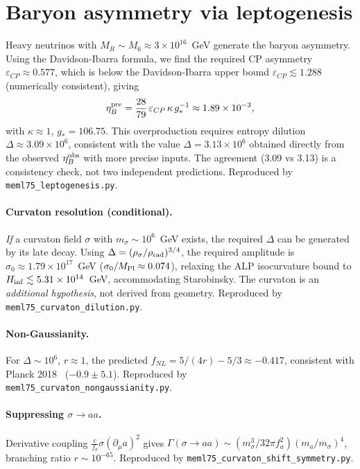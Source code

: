 \documentclass[12pt,a4paper]{article}
\numberwithin{equation}{section}
\begin{document}
\section{Baryon asymmetry via leptogenesis}
\label{sec:leptogenesis}
Heavy neutrinos with \(M_R \sim M_6 \approx 3\times10^{16}\)~GeV
generate the baryon asymmetry. Using the Davidson-Ibarra formula,
we find the required CP asymmetry
\(\varepsilon_{CP} \approx 0.577\), which is below the
Davidson-Ibarra upper bound \(\varepsilon_{CP} \lesssim 1.288\)
(numerically consistent), giving
\begin{equation}
\eta_B^{\rm pre} = \frac{28}{79}\,\varepsilon_{CP}\,\kappa\,g_*^{-1} \approx 1.89\times10^{-3},
\end{equation}
with \(\kappa \approx 1\), \(g_* = 106.75\). This overproduction requires entropy dilution
\(\Delta \approx 3.09\times10^6\), consistent with the value
\(\Delta = 3.13\times10^6\) obtained directly from the observed
\(\eta_B^{\rm obs}\) with more precise inputs. The agreement
(3.09 vs 3.13) is a consistency check, not two independent
predictions. Reproduced by \texttt{meml75\_leptogenesis.py}.

\paragraph{Curvaton resolution (conditional).}
\emph{If} a curvaton field \(\sigma\) with \(m_\sigma\sim10^6\)~GeV
exists, the required \(\Delta\) can be generated by its late decay.
Using \(\Delta = (\rho_\sigma/\rho_{\rm rad})^{3/4}\), the required
amplitude is \(\sigma_0 \approx 1.79\times10^{17}\)~GeV
(\(\sigma_0/M_{\rm Pl}\approx0.074\)), relaxing the ALP isocurvature
bound to \(H_{\rm inf}\lesssim5.31\times10^{14}\)~GeV, accommodating
Starobinsky. The curvaton is an \emph{additional hypothesis}, not
derived from geometry. Reproduced by
\texttt{meml75\_curvaton\_dilution.py}.

\paragraph{Non-Gaussianity.}
For \(\Delta\sim10^6\), \(r\approx1\), the predicted
\(f_{NL} = 5/(4r) - 5/3 \approx -0.417\), consistent with Planck
2018~\cite{Planck2018} (\(-0.9\pm5.1\)). Reproduced by
\texttt{meml75\_curvaton\_nongaussianity.py}.

\paragraph{Suppressing \(\sigma\to aa\).}
Derivative coupling \(\frac{c}{f_a}\sigma(\partial_\mu a)^2\) gives
\(\Gamma(\sigma\to aa) \sim (m_\sigma^3/32\pi f_a^2)(m_a/m_\sigma)^4\),
branching ratio \(r\sim10^{-65}\). Reproduced by
\texttt{meml75\_curvaton\_shift\_symmetry.py}.
\end{document}
